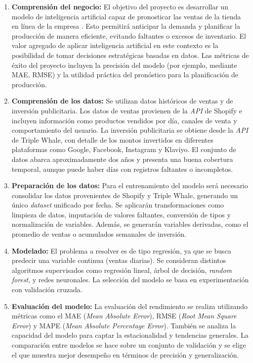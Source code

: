 \documentclass[
11pt, %
]{charter}
\begin{document}
\begin{enumerate}
  \item \textbf{Comprensión del negocio:}  
  El objetivo del proyecto es desarrollar un modelo de inteligencia artificial capaz de pronosticar las ventas de la tienda en línea de la empresa \empclientename. Esto permitirá anticipar la demanda y planificar la producción de manera eficiente, evitando faltantes o excesos de inventario. El valor agregado de aplicar inteligencia artificial en este contexto es la posibilidad de tomar decisiones estratégicas basadas en datos. Las métricas de éxito del proyecto incluyen la precisión del modelo (por ejemplo, mediante MAE, RMSE) y la utilidad práctica del pronóstico para la planificación de producción.

  \item \textbf{Comprensión de los datos:}  
  Se utilizan datos históricos de ventas y de inversión publicitaria. Los datos de ventas provienen de la \textit{API} de Shopify e incluyen información como productos vendidos por día, canales de venta y comportamiento del usuario. La inversión publicitaria se obtiene desde la \textit{API} de Triple Whale, con detalle de los montos invertidos en diferentes plataformas como Google, Facebook, Instagram y Klaviyo. El conjunto de datos abarca aproximadamente dos años y presenta una buena cobertura temporal, aunque puede haber días con registros faltantes o incompletos.

  \item \textbf{Preparación de los datos:}  
  Para el entrenamiento del modelo será necesario consolidar los datos provenientes de Shopify y Triple Whale, generando un único \textit{dataset} unificado por fecha. Se aplicarán transformaciones como limpieza de datos, imputación de valores faltantes, conversión de tipos y normalización de variables. Además, se generarán variables derivadas, como el promedio de ventas o acumulados semanales de inversión.

  \item \textbf{Modelado:}  
  El problema a resolver es de tipo regresión, ya que se busca predecir una variable continua (ventas diarias). Se consideran distintos algoritmos supervisados como regresión lineal, árbol de decisión, \textit{random forest}, y redes neuronales. La selección del modelo se basa en experimentación con validación cruzada.

  \item \textbf{Evaluación del modelo:}  
  La evaluación del rendimiento se realiza utilizando métricas como el MAE (\textit{Mean Absolute Error}), RMSE (\textit{Root Mean Square Error}) y MAPE (\textit{Mean Absolute Percentage Error}). También se analiza la capacidad del modelo para captar la estacionalidad y tendencias generales. La comparación entre modelos se hace sobre un conjunto de validación y se elige el que muestra mejor desempeño en términos de precisión y generalización.


\end{enumerate}
\end{document}
